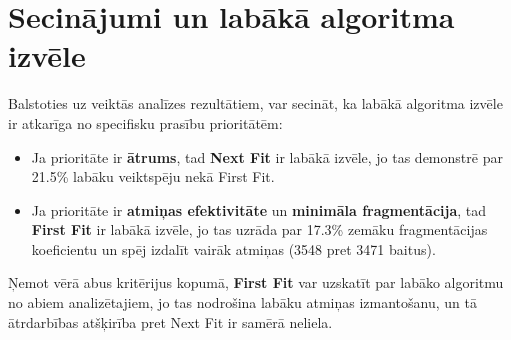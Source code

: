 \documentclass{report}
\begin{document}
	\section{Secinājumi un labākā algoritma izvēle}
	
	Balstoties uz veiktās analīzes rezultātiem, var secināt, ka labākā algoritma izvēle ir atkarīga no specifisku prasību prioritātēm:
	
	\begin{itemize}
		\item Ja prioritāte ir \textbf{ātrums}, tad \textbf{Next Fit} ir labākā izvēle, jo tas demonstrē par 21.5\% labāku veiktspēju nekā First Fit.
		
		\item Ja prioritāte ir \textbf{atmiņas efektivitāte} un \textbf{minimāla fragmentācija}, tad \textbf{First Fit} ir labākā izvēle, jo tas uzrāda par 17.3\% zemāku fragmentācijas koeficientu un spēj izdalīt vairāk atmiņas (3548 pret 3471 baitus).
	\end{itemize}
	
	Ņemot vērā abus kritērijus kopumā, \textbf{First Fit} var uzskatīt par labāko  algoritmu no abiem analizētajiem, jo tas nodrošina labāku atmiņas izmantošanu, un tā ātrdarbības atšķirība pret Next Fit ir samērā neliela.
	
\end{document}
